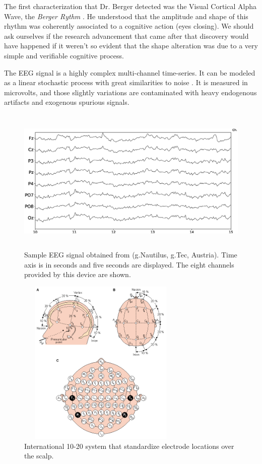 The first characterization that Dr. Berger detected was the Visual Cortical Alpha Wave, the \textit{Berger Rythm} \cite{Jansen1991}.  He understood that the amplitude and shape of this rhythm was coherently associated to a cognitive action (eyes closing).  
We should ask ourselves if the research advancement that came after that discovery would have happened if it weren't so evident that the shape alteration was due to a very simple and verifiable cognitive process.

The EEG signal is a highly complex multi-channel time-series.  It can be modeled as a linear stochastic process with great similarities to noise \cite{Thakor2004}.  It is measured in microvolts, and those slightly variations are contaminated with heavy endogenous artifacts and exogenous spurious signals.  
 
\begin{figure}[]
\centering
\includegraphics[height=7cm,width=14cm]{images/sampleeeg.eps}
\caption[Sample Multichannel EEG signal]{Sample EEG signal obtained from (g.Nautilus, g.Tec, Austria). Time axis is in seconds and five seconds are displayed.  The eight channels provided by this device are shown.}
\label{fig:sampleeeg}
\end{figure}


\begin{figure}[]
\centering
\includegraphics[height=8cm,width=8cm]{images/ElectrodePositions1020.png}
\caption[Electrode Locations]{International 10-20 system that standardize electrode locations over the scalp.}
\label{fig:electrodelocations}
\end{figure}


